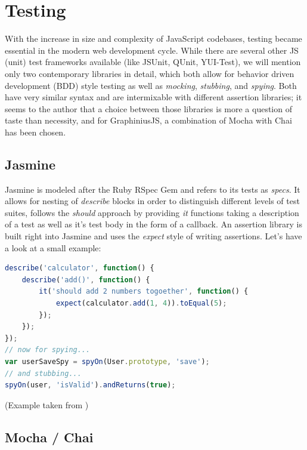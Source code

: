 	
\section{Testing}
\label{sect:testing}

	With the increase in size and complexity of JavaScript codebases, testing became essential in the modern web development cycle. While there are several other JS (unit) test frameworks available (like JSUnit, QUnit, YUI-Test), we will mention only two contemporary libraries in detail, which both allow for behavior driven development (BDD) style testing as well as \textit{mocking}, \textit{stubbing}, and \textit{spying}. Both have very similar syntax and are intermixable with different assertion libraries; it seems to the author that a choice between those libraries is more a question of taste than necessity, and for GraphiniusJS, a combination of Mocha with Chai has been chosen.

	\subsection{Jasmine}
	\label{ssect:jasmine}
	
	Jasmine \citep{hahn2013javascript} is modeled after the Ruby RSpec Gem and refers to its tests as \textit{specs}. It allows for nesting of \textit{describe} blocks in order to distinguish different levels of test suites, follows the \textit{should} approach by providing \textit{it} functions taking a description of a test as well as it's test body in the form of a callback. An assertion library is built right into Jasmine and uses the \textit{expect} style of writing assertions. Let's have a look at a small example:
	
	\begin{lstlisting}[caption={Jasmine example of a nested test suite containing one simple assertion in expect style as well as a spy and a stub}, label={fig:jasmine_expect}, language=JavaScript]
describe('calculator', function() {
	describe('add()', function() {
		it('should add 2 numbers togoether', function() {
			expect(calculator.add(1, 4)).toEqual(5);
		});
	});
});
// now for spying...
var userSaveSpy = spyOn(User.prototype, 'save');
// and stubbing...
spyOn(user, 'isValid').andReturns(true);
	\end{lstlisting}
	\small
	(Example taken from \citep{JSTestTest})
	
	
	\subsection{Mocha / Chai}
	\label{ssect:mocha_chai}
	
